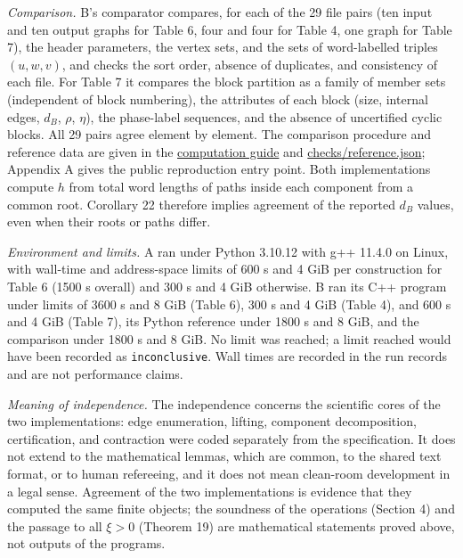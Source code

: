 \documentclass[11pt,reqno]{amsart}
\theoremstyle{definition}
\theoremstyle{remark}
\begin{document}
\emph{Comparison.} B's comparator compares, for each of the 29 file pairs
(ten input and ten output graphs for Table 6, four and four for Table 4,
one graph for Table 7), the header parameters, the vertex sets, and the
sets of word-labelled triples \((u,w,v)\), and checks the sort order,
absence of duplicates, and consistency of each file. For Table 7 it
compares the block partition as a family of member sets (independent of
block numbering), the attributes of each block (size, internal edges,
\(d_B\), \(\rho\), \(\eta\)), the phase-label sequences, and the absence
of uncertified cyclic blocks. All 29 pairs agree element by element. The comparison procedure and
reference data are given in the \href{supplement/COMPUTATION.md}{computation guide} and \href{checks/reference.json}{checks/reference.json};
Appendix A gives the public reproduction entry point.
Both implementations compute \(h\) from total word lengths of paths
inside each component from a common root. Corollary 22 therefore
implies agreement of the reported \(d_B\) values, even when their
roots or paths differ.

\emph{Environment and limits.} A ran under Python 3.10.12 with g++ 11.4.0
on Linux, with wall-time and address-space limits of 600 s and 4 GiB per
construction for Table 6 (1500 s overall) and 300 s and 4 GiB
otherwise. B ran its C++ program under limits of 3600 s and 8 GiB
(Table 6), 300 s and 4 GiB (Table 4), and 600 s and 4 GiB (Table 7),
its Python reference under 1800 s and 8 GiB, and the comparison under
1800 s and 8 GiB. No limit was reached; a limit reached would have been
recorded as \texttt{inconclusive}. Wall times are recorded in the run records
and are not performance claims.

\emph{Meaning of independence.} The independence concerns the scientific
cores of the two implementations: edge enumeration, lifting, component
decomposition, certification, and contraction were coded separately from
the specification. It does not extend to the mathematical lemmas, which
are common, to the shared text format, or to human refereeing, and it
does not mean clean-room development in a legal sense. Agreement of the
two implementations is evidence that they computed the same finite
objects; the soundness of the operations (Section 4) and the passage to
all \(\xi>0\) (Theorem 19) are mathematical statements proved above, not
outputs of the programs.

\end{document}

